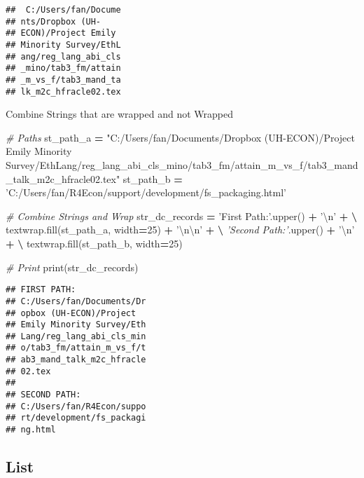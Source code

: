 \documentclass[
]{book}
\newenvironment{Shaded}{\begin{snugshade}}{\end{snugshade}}
\newcommand{\BuiltInTok}[1]{#1}
\newcommand{\CharTok}[1]{\textcolor[rgb]{0.31,0.60,0.02}{#1}}
\newcommand{\CommentTok}[1]{\textcolor[rgb]{0.56,0.35,0.01}{\textit{#1}}}
\newcommand{\DecValTok}[1]{\textcolor[rgb]{0.00,0.00,0.81}{#1}}
\newcommand{\NormalTok}[1]{#1}
\newcommand{\OperatorTok}[1]{\textcolor[rgb]{0.81,0.36,0.00}{\textbf{#1}}}
\newcommand{\StringTok}[1]{\textcolor[rgb]{0.31,0.60,0.02}{#1}}
\begin{document}
\begin{verbatim}
##  C:/Users/fan/Docume
## nts/Dropbox (UH-
## ECON)/Project Emily
## Minority Survey/EthL
## ang/reg_lang_abi_cls
## _mino/tab3_fm/attain
## _m_vs_f/tab3_mand_ta
## lk_m2c_hfracle02.tex
\end{verbatim}

Combine Strings that are wrapped and not Wrapped

\begin{Shaded}
\begin{Highlighting}[]

\CommentTok{# Paths}
\NormalTok{st_path_a }\OperatorTok{=} \StringTok{"C:/Users/fan/Documents/Dropbox (UH-ECON)/Project Emily Minority Survey/EthLang/reg_lang_abi_cls_mino/tab3_fm/attain_m_vs_f/tab3_mand_talk_m2c_hfracle02.tex"}
\NormalTok{st_path_b }\OperatorTok{=} \StringTok{'C:/Users/fan/R4Econ/support/development/fs_packaging.html'}

\CommentTok{# Combine Strings and Wrap}
\NormalTok{str_dc_records }\OperatorTok{=} \StringTok{'First Path:'}\NormalTok{.upper() }\OperatorTok{+} \StringTok{'}\CharTok{\textbackslash{}n}\StringTok{'} \OperatorTok{+} \OperatorTok{\textbackslash{}}
\NormalTok{                 textwrap.fill(st_path_a, width}\OperatorTok{=}\DecValTok{25}\NormalTok{) }\OperatorTok{+} \StringTok{'}\CharTok{\textbackslash{}n\textbackslash{}n}\StringTok{'} \OperatorTok{+} \OperatorTok{\textbackslash{}}
                 \CommentTok{'Second Path:'}\NormalTok{.upper() }\OperatorTok{+} \StringTok{'}\CharTok{\textbackslash{}n}\StringTok{'} \OperatorTok{+} \OperatorTok{\textbackslash{}}
\NormalTok{                 textwrap.fill(st_path_b, width}\OperatorTok{=}\DecValTok{25}\NormalTok{)}
              
\CommentTok{# Print}
\BuiltInTok{print}\NormalTok{(str_dc_records)                 }
\end{Highlighting}
\end{Shaded}

\begin{verbatim}
## FIRST PATH:
## C:/Users/fan/Documents/Dr
## opbox (UH-ECON)/Project
## Emily Minority Survey/Eth
## Lang/reg_lang_abi_cls_min
## o/tab3_fm/attain_m_vs_f/t
## ab3_mand_talk_m2c_hfracle
## 02.tex
## 
## SECOND PATH:
## C:/Users/fan/R4Econ/suppo
## rt/development/fs_packagi
## ng.html
\end{verbatim}

\hypertarget{list}{%
\subsection{List}\label{list}}
\end{document}
